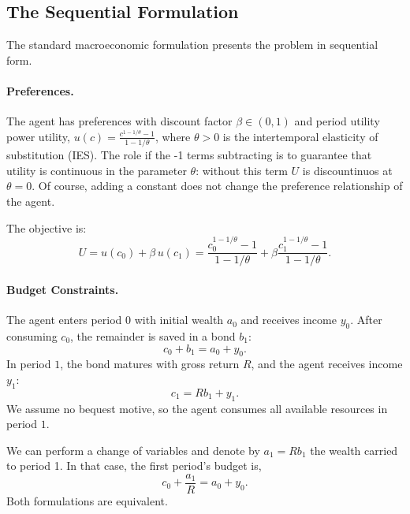 \subsection{The Sequential Formulation}
\label{subsec:sequential}

The standard macroeconomic formulation presents the problem in sequential form.

\paragraph{Preferences.}
The agent has preferences with discount factor $\beta \in (0,1)$ and period utility power utility, $u(c) = \frac{c^{1-1/\theta} - 1}{1 - 1/\theta}$, where $\theta > 0$ is the intertemporal elasticity of substitution (IES). The role if the -1 terms subtracting is to guarantee that utility is continuous in the parameter $\theta$: without this term $U$ is discountinuos at $\theta=0.$ Of course, adding a constant does not change the preference relationship of the agent.

The objective is:
\begin{equation}
U = u(c_0) + \beta \, u(c_1) = \frac{c_0^{1-1/\theta} - 1}{1 - 1/\theta} + \beta \frac{c_1^{1-1/\theta} - 1}{1 - 1/\theta}.
\label{eq:objective-sequential}
\end{equation}

\paragraph{Budget Constraints.}
The agent enters period $0$ with initial wealth $a_0$ and receives income $y_0$. After consuming $c_0$, the remainder is saved in a bond $b_1$:
\begin{equation}
c_0 + b_1 = a_0 + y_0.
\label{eq:budget-t0}
\end{equation}
In period $1$, the bond matures with gross return $R$, and the agent receives income $y_1$:
\begin{equation}
c_1 = R b_1 + y_1.
\label{eq:budget-t1}
\end{equation}
We assume no bequest motive, so the agent consumes all available resources in period $1$. 

We can perform a change of variables and denote by $a_1=R b_1$ the wealth carried to period 1. In that case, the first period's budget is,
\[
c_0 + \frac{a_1}{R} = a_0 + y_0.
\]
Both formulations are equivalent. 


